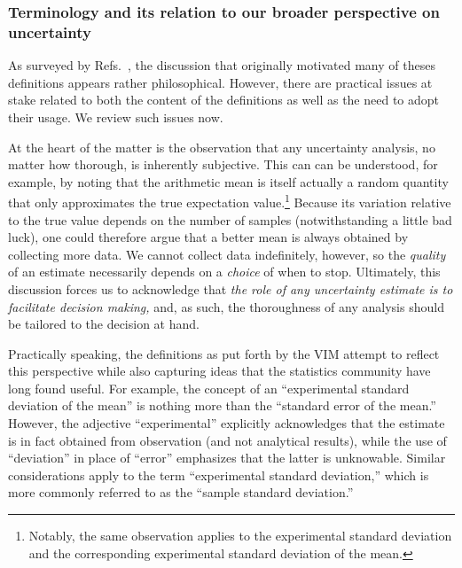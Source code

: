 \subsubsection{Terminology and its relation to our broader perspective on uncertainty}

As surveyed by Refs.~\citep{JCGM:GUM2008,JCGM:VIM2012}, the discussion that originally motivated many of theses definitions appears rather philosophical.  However, there are practical issues at stake related to both the content of the definitions as well as the need to adopt their usage.  We review such issues now.

At the heart of the matter is the observation that any uncertainty analysis, no matter how thorough, is inherently subjective.  This can can be understood, for example, by noting that the arithmetic mean is itself actually a random quantity that only approximates the true expectation value.\footnote{Notably, the same observation applies to the experimental standard deviation and the corresponding experimental standard deviation of the mean.}  Because its variation relative to the true value depends on the number of samples (notwithstanding a little bad luck), one could therefore argue that a better mean is always obtained by collecting more data.   We cannot collect data indefinitely, however, so the {\it quality} of an estimate necessarily depends on a {\it choice} of when to stop.  Ultimately, this discussion forces us to acknowledge that {\it the role of any uncertainty estimate is to facilitate decision making,} and, as such, the thoroughness of any analysis should be tailored to the decision at hand.

Practically speaking, the definitions as put forth by the VIM attempt to reflect this perspective while also capturing ideas that the statistics community have long found useful.  For example, the concept of an ``experimental standard deviation of the mean'' is nothing more than the ``standard error of the mean.''  However, the adjective ``experimental'' explicitly acknowledges that the estimate is in fact obtained from observation (and not analytical results), while the use of ``deviation'' in place of ``error'' emphasizes that the latter is unknowable.  Similar considerations apply to the term ``experimental standard deviation,'' which is more commonly referred to as the ``sample standard deviation.''

